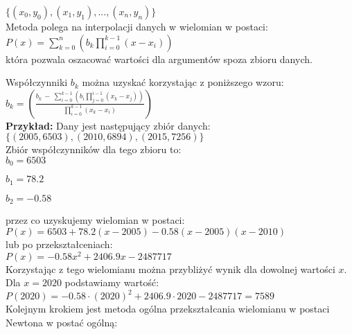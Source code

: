 \documentclass[a4paper,12pt]{article}
\newcommand{\id}{\noindent}
\newcommand{\bl}[1]{\textbf{#1}}
\begin{document}
$\{ (x_0, y_0), (x_1, y_1), ..., (x_n, y_n) \}$ \\

\id
Metoda polega na interpolacji danych w wielomian w postaci: \\

$P(x) = \sum\limits_{k=0}^{n}\left( b_k\prod\limits_{i=0}^{k-1}(x-x_i) \right )$ \\

\id
która pozwala oszacować wartości dla argumentów spoza zbioru danych. \\

\newpage

\id
Współczynniki $b_k$ można uzyskać korzystając z poniższego wzoru: \\

$b_k = \left( \frac{b_k \ - \ \sum\limits_{i=0}^{k-1}\left( b_i\prod\limits_{j=0}^{i-1}(x_k-x_j) \right)}{\prod\limits_{i = 0}^{k-1}(x_k - x_i)} \right)$ \\

\id
\bl{Przykład:} Dany jest następujący zbiór danych: \\

$\{ (2005, 6503), (2010, 6894), (2015, 7256) \}$ \\

\id
Zbiór współczynników dla tego zbioru to: \\

$b_0 = 6503$

$b_1 = 78.2$

$b_2 = -0.58$

\id
przez co uzyskujemy wielomian w postaci: \\

$P(x) = 6503 + 78.2(x - 2005) - 0.58(x - 2005)(x - 2010)$ \\

\id
lub po przekształceniach: \\

$P(x) = -0.58x^2 + 2406.9 x - 2487717$ \\

\id
Korzystając z tego wielomianu można przybliżyć wynik dla dowolnej wartości $x$. Dla $x = 2020$ podstawiamy wartość: \\

$P(2020) = -0.58\cdot (2020)^2 + 2406.9\cdot 2020 - 2487717 = 7589$ \\

\id
Kolejnym krokiem jest metoda ogólna przekształcania wielomianu w postaci Newtona w postać ogólną: \\
\end{document}
